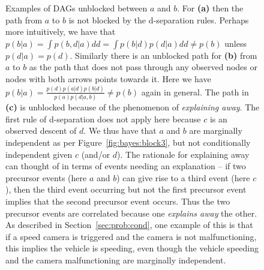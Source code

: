 \begin{figure}[p]
	\centering 
	\hspace{-15pt}
	\begin{subfigure}[t]{0.32\textwidth}
		\centering
		\resizebox{0.9\textwidth}{!}{
		}
		\caption{\label{fig:bayes:unblock1}}
	\end{subfigure}
	\begin{subfigure}[t]{0.32\textwidth}
		\centering
		\resizebox{0.9\textwidth}{!}{
		}
		\caption{\label{fig:bayes:unblock2}}
	\end{subfigure}
	\begin{subfigure}[t]{0.32\textwidth}
		\centering
		\resizebox{1.1\textwidth}{!}{
		}
		\caption{\label{fig:bayes:unblock3}}
	\end{subfigure}
	\caption{Examples of DAGs unblocked between $a$ and $b$. For \textbf{(a)} then the path from $a$ to
		$b$ is not blocked by the d-separation rules.  Perhaps more intuitively, we have that
		$p(b|a) = \int p(b,d|a) dd = \int p(b|d)p(d|a) dd \neq p(b)$ unless $p(d|a)=p(d)$.
		Similarly there is an unblocked path for \textbf{(b)} from $a$ to $b$ as the path
		that does not pass through any observed nodes or nodes with both arrows points towards it.
		Here we have $p(b|a) = \frac{p(d)p(a|d)p(b|d)}{p(a)p(d|a,b)} \neq p(b)$ again in general.
		The path in \textbf{(c)} is unblocked because of the phenomenon of \emph{explaining away}.
		The first rule of d-separation does not apply here because $c$ is an observed descent of
		$d$.  We thus have that $a$ and $b$ are marginally independent as per Figure~\ref{fig:bayes:block3},
		but not conditionally independent given $c$ (and/or $d$). The rationale for explaining away can thought
		of in terms of events needing an explanation -- if two precursor events (here $a$ and $b$) can give rise 
		to a third event (here $c$), then
		the third event occurring but not the first precursor event implies that the second precursor
		event occurs.  Thus the two precursor events are correlated because one \emph{explains away} the other.
		As described in Section~\ref{sec:prob:cond}, one example of this is that if a speed camera is
		triggered and the camera is not malfunctioning, this implies the vehicle is speeding, even though
		the vehicle speeding and the camera malfunctioning are marginally independent.	
		\label{fig:bayes:unblocked-graphs}}
\end{figure}

